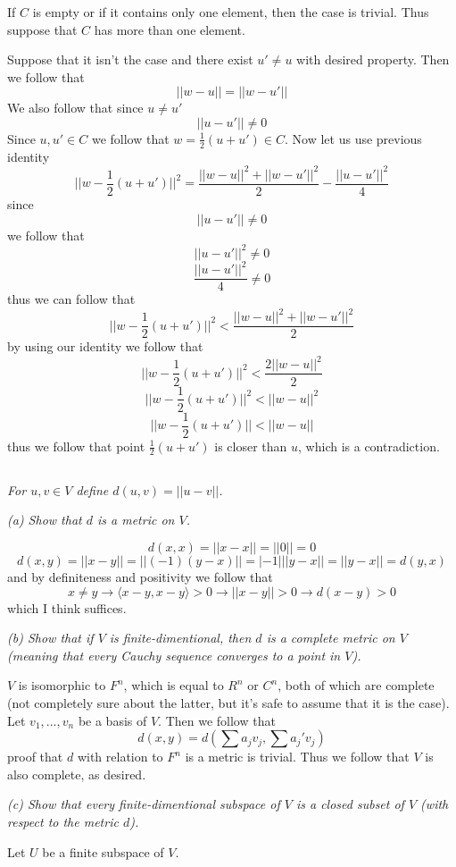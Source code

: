 \documentclass[11pt,oneside,titlepage]{book}
\newcommand{\eangle}[1]{\langle #1 \rangle}
\begin{document}
If $C$ is empty or if it contains only one element, then the case is trivial. Thus suppose that
$C$ has more than one element.

Suppose that it isn't the case and there exist $u' \neq u$ with desired property. Then we
follow that
$$||w - u|| = ||w - u'||$$
We also follow that since $u \neq u'$
$$||u - u'|| \neq 0$$
Since $u, u' \in C$ we follow that $w = \frac{1}{2}(u + u') \in C$. Now let us use previous
identity
$$||w - \frac{1}{2}(u + u')||^2 = \frac{||w - u||^2 + ||w - u'||^2}{2} - \frac{||u - u'||^2}{4}$$
since
$$||u - u'|| \neq 0$$
we follow that
$$||u - u'||^2 \neq 0$$
$$\frac{||u - u'||^2}{4} \neq 0$$
thus we can follow that
$$||w - \frac{1}{2}(u + u')||^2 < \frac{||w - u||^2 + ||w - u'||^2}{2}$$
by using our identity we follow that
$$||w - \frac{1}{2}(u + u')||^2 < \frac{2||w - u||^2}{2}$$
$$||w - \frac{1}{2}(u + u')||^2 < ||w - u||^2$$
$$||w - \frac{1}{2}(u + u')|| < ||w - u||$$
thus we follow that point $\frac{1}{2}(u + u')$  is closer than $u$, which is a contradiction.

\subsection{}

\textit{For $u, v \in V$ define $d(u, v) = ||u - v||$.}

\textit{(a) Show that $d$ is a metric on $V$.}

$$d(x, x) = ||x - x|| = ||0|| = 0$$
$$d(x, y) = ||x - y|| = ||(-1)(y - x)|| = |-1|||y - x|| = ||y - x|| = d(y, x)$$
and by definiteness and positivity we follow that
$$x \neq y \to \eangle{x - y, x - y} > 0 \to ||x - y|| > 0 \to d(x - y) > 0$$
which I think suffices.

\textit{(b) Show that if $V$ is finite-dimentional, then $d$ is a complete metric
  on $V$ (meaning that every Cauchy sequence converges to a point in $V$).}

$V$ is isomorphic to $F^n$, which is equal to $R^n$ or $C^n$, both of which are complete
(not completely sure about the latter, but it's safe to assume that it is the case).
Let $v_1, ..., v_n$ be a basis of $V$. Then we follow that
$$d(x, y) = d(\sum {a_j v_j}, \sum {a_j' v_j})$$
proof that $d$ with relation to $F^n$ is a metric is trivial.
Thus we follow that $V$ is also complete, as desired.

\textit{(c) Show that every finite-dimentional subspace of $V$ is a closed subset of
  $V$ (with respect to the metric $d$).}

Let $U$ be a finite subspace of $V$.
\end{document}
